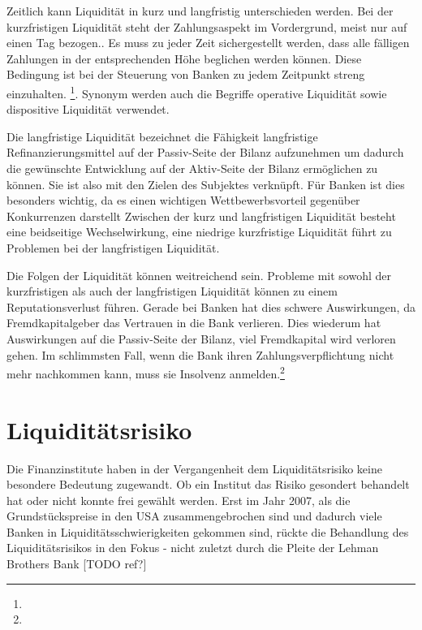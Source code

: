 Zeitlich kann Liquidität in kurz und langfristig unterschieden werden. Bei der kurzfristigen Liquidität steht der Zahlungsaspekt im Vordergrund, meist nur auf einen Tag bezogen.. Es muss zu jeder Zeit sichergestellt werden, dass alle fälligen Zahlungen in der entsprechenden Höhe beglichen werden können. Diese Bedingung ist bei der Steuerung von Banken zu jedem Zeitpunkt streng einzuhalten. \footnote{ }. Synonym werden auch die Begriffe operative Liquidität sowie dispositive Liquidität verwendet.

Die langfristige Liquidität bezeichnet die Fähigkeit langfristige Refinanzierungsmittel auf der Passiv-Seite der Bilanz aufzunehmen um dadurch die gewünschte Entwicklung auf der Aktiv-Seite der Bilanz ermöglichen zu können. Sie ist also mit den Zielen des Subjektes verknüpft. Für Banken ist dies besonders wichtig, da es einen wichtigen Wettbewerbsvorteil gegenüber Konkurrenzen darstellt Zwischen der kurz und langfristigen Liquidität besteht eine beidseitige Wechselwirkung, eine niedrige kurzfristige Liquidität führt zu Problemen bei der langfristigen Liquidität.

Die Folgen der Liquidität können weitreichend sein. Probleme mit sowohl der kurzfristigen als auch der langfristigen Liquidität können zu einem Reputationsverlust führen. Gerade bei Banken hat dies schwere Auswirkungen, da Fremdkapitalgeber das Vertrauen in die Bank verlieren. Dies wiederum hat Auswirkungen auf die Passiv-Seite der Bilanz, viel Fremdkapital wird verloren gehen. Im schlimmsten Fall, wenn die Bank ihren Zahlungsverpflichtung nicht mehr nachkommen kann, muss sie Insolvenz anmelden.\footnote{ }

\section{Liquiditätsrisiko}
Die Finanzinstitute haben in der Vergangenheit dem Liquiditätsrisiko keine besondere Bedeutung zugewandt. Ob ein Institut das Risiko gesondert behandelt hat oder nicht konnte frei gewählt werden. Erst im Jahr 2007, als die Grundstückspreise in den USA zusammengebrochen sind und dadurch viele Banken in Liquiditätsschwierigkeiten gekommen sind, rückte die Behandlung des Liquiditätsrisikos in den Fokus - nicht zuletzt durch die Pleite der Lehman Brothers Bank  [TODO ref?]

